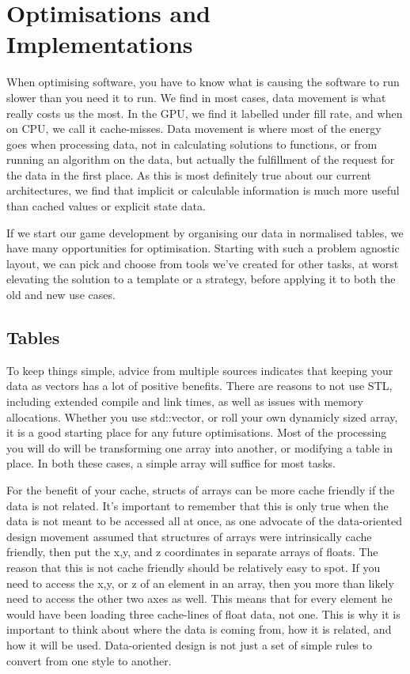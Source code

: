 \chapter[Optimisations]{Optimisations and Implementations}

When optimising software, you have to know what is causing the software to run
slower than you need it to run. We find in most cases, data movement is what
really costs us the most. In the GPU, we find it labelled under fill rate, and
when on CPU, we call it cache-misses. Data movement is where most of the energy
goes when processing data, not in calculating solutions to functions, or from
running an algorithm on the data, but actually the fulfillment of the request
for the data in the first place.  As this is most definitely true about our
current architectures, we find that implicit or calculable information is much
more useful than cached values or explicit state data.

If we start our game development by organising our data in normalised tables,
we have many opportunities for optimisation. Starting with such a problem
agnostic layout, we can pick and choose from tools we've created for other
tasks, at worst elevating the solution to a template or a strategy, before
applying it to both the old and new use cases.

\section{Tables}

To keep things simple, advice from multiple sources indicates that keeping your
data as vectors has a lot of positive benefits. There are reasons to not use
STL, including extended compile and link times, as well as issues with memory
allocations. Whether you use std::vector, or roll your own dynamicly sized
array, it is a good starting place for any future optimisations. Most of the
processing you will do will be transforming one array into another, or
modifying a table in place. In both these cases, a simple array will suffice
for most tasks.

For the benefit of your cache, structs of arrays can be more cache friendly if
the data is not related. It's important to remember that this is only true when
the data is not meant to be accessed all at once, as one advocate of the
data-oriented design movement assumed that structures of arrays were
intrinsically cache friendly, then put the x,y, and z coordinates in separate
arrays of floats. The reason that this is not cache friendly should be
relatively easy to spot. If you need to access the x,y, or z of an element in
an array, then you more than likely need to access the other two axes as well.
This means that for every element he would have been loading three cache-lines
of float data, not one.  This is why it is important to think about where the
data is coming from, how it is related, and how it will be used. Data-oriented
design is not just a set of simple rules to convert from one style to another.

